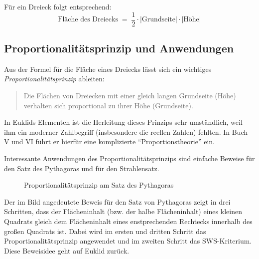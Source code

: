 


Für ein Dreieck folgt entsprechend:
$$
    \mbox{Fläche des Dreiecks} \; = \; \frac{1}{2} \cdot |\mbox{Grundseite}| \cdot |\mbox{Höhe}|
$$

\subsection*{Proportionalitätsprinzip und Anwendungen}

Aus der Formel für die Fläche eines Dreiecks lässt sich ein wichtiges {\em Proportionalitätsprinzip}
ableiten:


\begin{quote}
    Die Flächen von Dreiecken mit einer gleich langen Grundseite (Höhe) verhalten sich proportional
    zu ihrer Höhe (Grundseite).
\end{quote}

In Euklids Elementen ist die Herleitung dieses Prinzips sehr umständlich, weil ihm ein moderner
Zahlbegriff (insbesondere die reellen Zahlen) fehlten. In Buch V und VI führt er hierfür eine
komplizierte "`Proportionstheorie"' ein.

Interessante Anwendungen des Proportionalitätsprinzips sind einfache Beweise für den Satz des
Pythagoras und für den Strahlensatz. %


\begin{figure}[h]
    
    \caption{Proportionalitätsprinzip am Satz des Pythagoras}
\end{figure}

Der im Bild angedeutete Beweis für den Satz von Pythagoras zeigt in drei Schritten, dass der
Flächeninhalt (bzw. der halbe Flächeninhalt) eines kleinen Quadrats gleich dem Flächeninhalt eines
enstprechenden Rechtecks innerhalb des großen Quadrats ist. Dabei wird im ersten und dritten Schritt
das Proportionalitätsprinzip angewendet und im zweiten Schritt das SWS-Kriterium. Diese Beweisidee
geht auf Euklid zurück.

